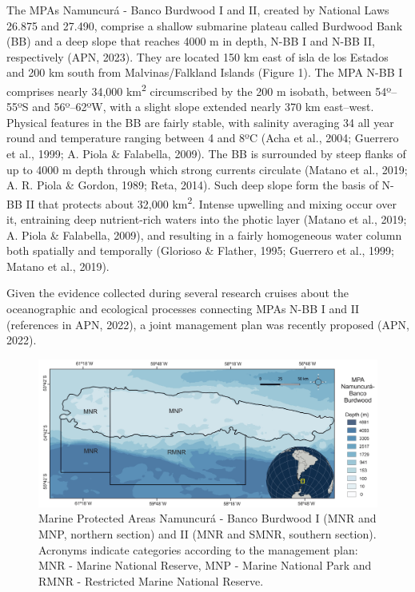 \documentclass[preprint, 3p,
authoryear]{elsarticle} %
\begin{document}
The MPAs Namuncurá - Banco Burdwood I and II, created by National Laws
26.875 and 27.490, comprise a shallow submarine plateau called Burdwood
Bank (BB) and a deep slope that reaches 4000 m in depth, N-BB I and N-BB
II, respectively (APN, 2023). They are located 150 km east of isla de
los Estados and 200 km south from Malvinas/Falkland Islands (Figure 1).
The MPA N-BB I comprises nearly 34,000 km\textsuperscript{2}
circumscribed by the 200 m isobath, between 54º--55ºS and 56º--62ºW,
with a slight slope extended nearly 370 km east--west. Physical features
in the BB are fairly stable, with salinity averaging 34 all year round
and temperature ranging between 4 and 8ºC (Acha et al., 2004; Guerrero
et al., 1999; A. Piola \& Falabella, 2009). The BB is surrounded by
steep flanks of up to 4000 m depth through which strong currents
circulate (Matano et al., 2019; A. R. Piola \& Gordon, 1989; Reta,
2014). Such deep slope form the basis of N-BB II that protects about
32,000 km\textsuperscript{2}. Intense upwelling and mixing occur over
it, entraining deep nutrient-rich waters into the photic layer (Matano
et al., 2019; A. Piola \& Falabella, 2009), and resulting in a fairly
homogeneous water column both spatially and temporally (Glorioso \&
Flather, 1995; Guerrero et al., 1999; Matano et al., 2019).

Given the evidence collected during several research cruises about the
oceanographic and ecological processes connecting MPAs N-BB I and II
(references in APN, 2022), a joint management plan was recently proposed
(APN, 2022).

\begin{figure}
\includegraphics[width=1\linewidth]{MPABurdwood_map} \caption{Marine Protected Areas Namuncurá - Banco Burdwood I (MNR and MNP, northern section) and II (MNR and SMNR, southern section). Acronyms indicate categories according to the management plan: MNR - Marine National Reserve, MNP - Marine National Park and RMNR - Restricted Marine National Reserve.}\label{fig:figure1}
\end{figure}
\end{document}
